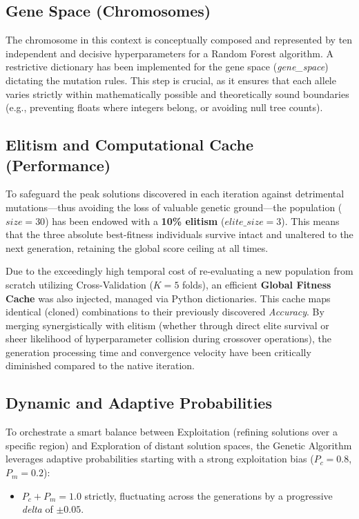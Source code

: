 \documentclass[12pt, a4paper]{article}
\begin{document}
\subsection{Gene Space (Chromosomes)}
The chromosome in this context is conceptually composed and represented by ten independent and decisive hyperparameters for a Random Forest algorithm. 
A restrictive dictionary has been implemented for the gene space (\textit{gene\_space}) dictating the mutation rules. This step is crucial, as it ensures that each allele varies strictly within mathematically possible and theoretically sound boundaries (e.g., preventing floats where integers belong, or avoiding null tree counts).

\subsection{Elitism and Computational Cache (Performance)}
To safeguard the peak solutions discovered in each iteration against detrimental mutations—thus avoiding the loss of valuable genetic ground—the population ($size=30$) has been endowed with a \textbf{10\% elitism} ($elite\_size=3$). This means that the three absolute best-fitness individuals survive intact and unaltered to the next generation, retaining the global score ceiling at all times.

Due to the exceedingly high temporal cost of re-evaluating a new population from scratch utilizing Cross-Validation ($K=5$ folds), an efficient \textbf{Global Fitness Cache} was also injected, managed via Python dictionaries. This cache maps identical (cloned) combinations to their previously discovered \textit{Accuracy}. By merging synergistically with elitism (whether through direct elite survival or sheer likelihood of hyperparameter collision during crossover operations), the generation processing time and convergence velocity have been critically diminished compared to the native iteration.

\subsection{Dynamic and Adaptive Probabilities}
To orchestrate a smart balance between Exploitation (refining solutions over a specific region) and Exploration of distant solution spaces, the Genetic Algorithm leverages adaptive probabilities starting with a strong exploitation bias ($P_c = 0.8$, $P_m = 0.2$):
\begin{itemize}[itemsep=0.2em]
    \item $P_c + P_m = 1.0$ strictly, fluctuating across the generations by a progressive \textit{delta} of $\pm 0.05$.
\end{itemize}
\end{document}
